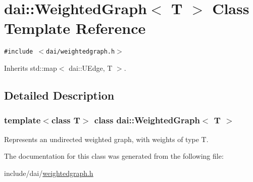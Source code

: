\hypertarget{classdai_1_1WeightedGraph}{
\section{dai::WeightedGraph$<$ T $>$ Class Template Reference}
\label{classdai_1_1WeightedGraph}
}
{\tt \#include $<$dai/weightedgraph.h$>$}

Inherits std::map$<$ dai::UEdge, T $>$.



\subsection{Detailed Description}
\subsubsection*{template$<$class T$>$ class dai::WeightedGraph$<$ T $>$}

Represents an undirected weighted graph, with weights of type T. 

The documentation for this class was generated from the following file:\begin{CompactItemize}
\item 
include/dai/\hyperlink{weightedgraph_8h}{weightedgraph.h}\end{CompactItemize}
